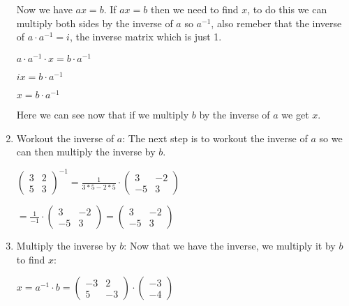 \documentclass[options]{article}
\begin{document}
\begin{enumerate}
    Now we have \(ax = b\). If \(ax = b\) then we need to find \(x\), to do this we can multiply both sides by the inverse of \(a\) so \(a^{-1}\), also
    remeber that the inverse of \(a \cdot a^{-1} = i\), the inverse matrix which is just 1. 
    \begin{center}
        \(
            a
            \cdot
            a^{-1}
            \cdot
            x
            =
            b\cdot
            a^{-1}
        \)

        \(
            ix = b\cdot a^{-1}
        \)

        \(
            x = b\cdot a^{-1}
        \)
    \end{center}
    Here we can see now that if we multiply \(b\) by the inverse of \(a\) we get \(x\).
    \item Workout the inverse of \(a\):
    The next step is to workout the inverse of \(a\) so we can then multiply the inverse by \(b\).
    \begin{center}
    
    \(
        \begin{pmatrix}
            3 & 2\\
            5 & 3
        \end{pmatrix}
        ^{-1} = 
        \frac{1}{3*5 - 2*5}
        \cdot
        \begin{pmatrix}
            3 & -2\\
            -5 & 3
        \end{pmatrix}
    \)
    \end{center}

    \begin{center}
        \(
            = \frac{1}{-1}
            \cdot
            \begin{pmatrix}
                3 & -2\\
                -5 & 3
            \end{pmatrix}
            =
            \begin{pmatrix}
                3 & -2\\
                -5 & 3
            \end{pmatrix}
        \)
    \end{center}
    \item Multiply the inverse by \(b\):
    Now that we have the inverse, we multiply it by \(b\) to find \(x\):
    \begin{center}
        \(
            x = a^{-1} \cdot b = 
            \begin{pmatrix}
                -3 & 2\\
                5 & -3
            \end{pmatrix}
            \cdot
            \begin{pmatrix}
                -3\\
                -4
            \end{pmatrix}
        \)


\end{center}
\end{enumerate}
\end{document}
